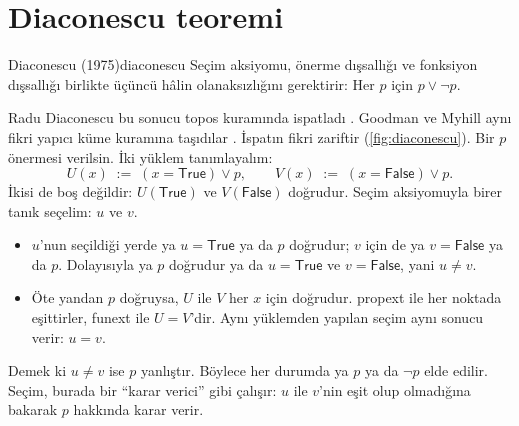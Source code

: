 \section{Diaconescu teoremi}\label{sec:diaconescu}

\begin{teorem}{Diaconescu (1975)}{diaconescu}
Seçim aksiyomu, önerme dışsallığı ve fonksiyon dışsallığı birlikte
üçüncü hâlin olanaksızlığını gerektirir: Her $p$ için $p \lor \lnot p$.
\end{teorem}

\noindent Radu Diaconescu bu sonucu topos kuramında ispatladı
\citep{diaconescu1975}. Goodman ve Myhill aynı fikri yapıcı küme kuramına
taşıdılar \citep{goodman1978}. İspatın fikri zariftir
(\cref{fig:diaconescu}). Bir $p$ önermesi verilsin. İki yüklem tanımlayalım:
\[
  U(x) \;:=\; (x = \mathsf{True}) \lor p,
  \qquad
  V(x) \;:=\; (x = \mathsf{False}) \lor p .
\]
İkisi de boş değildir: $U(\mathsf{True})$ ve $V(\mathsf{False})$
doğrudur. Seçim aksiyomuyla birer tanık seçelim: $u$ ve $v$.

\begin{itemize}
  \item $u$'nun seçildiği yerde ya $u = \mathsf{True}$ ya da $p$ doğrudur;
        $v$ için de ya $v = \mathsf{False}$ ya da $p$. Dolayısıyla ya
        $p$ doğrudur ya da $u = \mathsf{True}$ ve $v = \mathsf{False}$,
        yani $u \neq v$.
  \item Öte yandan $p$ doğruysa, $U$ ile $V$ her $x$ için doğrudur. propext
        ile her noktada eşittirler, funext ile $U = V$'dir. Aynı yüklemden
        yapılan seçim aynı sonucu verir: $u = v$.
\end{itemize}

\noindent Demek ki $u \neq v$ ise $p$ yanlıştır. Böylece her durumda ya $p$
ya da $\lnot p$ elde edilir. Seçim, burada bir ``karar verici'' gibi
çalışır: $u$ ile $v$'nin eşit olup olmadığına bakarak $p$ hakkında karar
verir.

